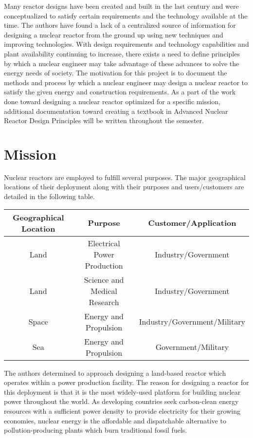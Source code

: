 \documentclass[]{report}
\begin{document}
Many reactor designs have been created and built in the last century and were conceptualized to satisfy certain requirements and the technology available at the time.
The authors have found a lack of a centralized source of information for designing a nuclear reactor from the ground up using new techniques and improving technologies.
With design requirements and technology capabilities and plant availability continuing to increase, there exists a need to define principles by which a nuclear engineer may take advantage of these advances to solve the energy needs of society.
The motivation for this project is to document the methods and process by which a nuclear engineer may design a nuclear reactor to satisfy the given energy and construction requirements.  
As a part of the work done toward designing a nuclear reactor optimized for a specific mission, additional documentation toward creating a textbook in Advanced Nuclear Reactor Design Principles will be written throughout the semester.

\section{Mission}

Nuclear reactors are employed to fulfill several purposes.  The major geographical locations of their deployment along with their purposes and users/customers are detailed in the following table.

\begin{center}
\begin{tabular}[pos{c}]{| c | c | c |}
\hline
Geographical Location & Purpose & Customer/Application \\
\hline
Land & Electrical Power Production & Industry/Government \\
\hline
Land & Science and Medical Research & Industry/Government \\
\hline
Space & Energy and Propulsion & Industry/Government/Military \\
\hline
Sea & Energy and Propulsion & Government/Military \\
\hline
\end{tabular}
\end{center}

The authors determined to approach designing a land-based reactor which operates within a power production facility.
The reason for designing a reactor for this deployment is that it is the most widely-used platform for building nuclear power throughout the world.
As developing countries seek carbon-clean energy resources with a sufficient power density to provide electricity for their growing economies, nuclear energy is the affordable and dispatchable %
alternative to pollution-producing plants which burn traditional fossil fuels.
\end{document}
